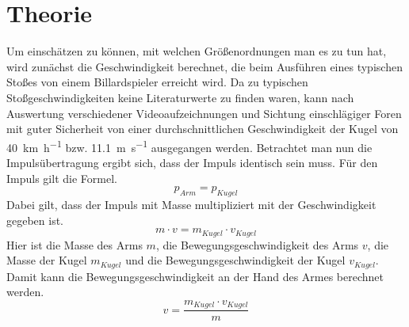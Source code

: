 \chapter{Theorie}
		Um einschätzen zu können, mit welchen Größenordnungen man es zu tun hat, wird zunächst die Geschwindigkeit berechnet, die beim Ausführen eines typischen Stoßes von einem Billardspieler erreicht wird.
		Da zu typischen Stoßgeschwindigkeiten keine Literaturwerte zu finden waren, kann nach Auswertung verschiedener Videoaufzeichnungen und Sichtung einschlägiger Foren mit guter Sicherheit von einer durchschnittlichen Geschwindigkeit der Kugel von \SI{40}{\kilo\metre\per\hour} bzw. \SI{11,1}{\metre\per\second} ausgegangen werden. 
		Betrachtet man nun die Impulsübertragung ergibt sich, dass der Impuls identisch sein muss. 
		Für den Impuls gilt die Formel.
		\begin{equation}
			p_{Arm} = p_{Kugel}
			\label{eq:Impuls}
		\end{equation}
		Dabei gilt, dass der Impuls mit Masse multipliziert mit der Geschwindigkeit gegeben ist.  
		\begin{equation}
			m\cdot v = m_{Kugel} \cdot v_{Kugel}%
			\label{eq:ImpulsKugel}
		\end{equation}
		Hier ist die Masse des Arms \(m\), die Bewegungsgeschwindigkeit des Arms \(v\), die Masse der Kugel \(m_{Kugel}\) und die Bewegungsgeschwindigkeit der Kugel \(v_{Kugel}\).
		Damit kann die Bewegungsgeschwindigkeit an der Hand des Armes berechnet werden.
		\begin{equation}
			v = \frac{m_{Kugel} \cdot v_{Kugel}}{m}%
			\label{eq:SollgeschwindikeitArm}
		\end{equation}
